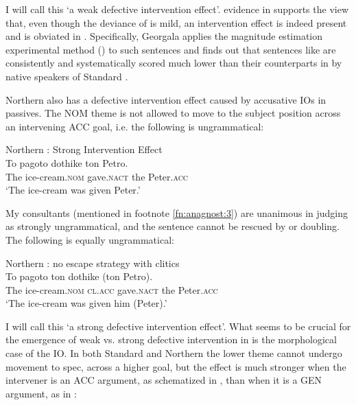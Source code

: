 \documentclass[output=paper]{LSP/langsci}
\begin{document}
I will call this ‘a weak defective intervention effect’.  evidence in \citet{Georgala2012} supports the view that, even though the deviance of  is mild, an intervention effect is indeed present and is obviated in . Specifically, Georgala applies the magnitude estimation experimental method (\citealt{GurmanEtAl1996,Cowart1997,Keller2000}) to such sentences and finds out that sentences like  are consistently and systematically scored much lower than their counterparts in  by native speakers of Standard .   

Northern  also has a defective intervention effect caused by accusative IOs in passives. The NOM theme is not allowed to move to the subject position across an intervening ACC goal, i.e. the following is ungrammatical:

\largerpage
\ea\label{ex:anagnost:17}
Northern : Strong Intervention Effect\\
\gll   * To pagoto dothike  ton Petro.\\
  {} The ice-cream.\textsc{nom}  gave.\textsc{nact} the Peter.\textsc{acc}\\

\glt 
  ‘The ice-cream was given Peter.’    
\z


My consultants (mentioned in footnote \ref{fn:anagnost:3}) are unanimous in judging  as strongly ungrammatical, and the sentence cannot be rescued by  or doubling. The following is equally ungrammatical:


\ea \label{ex:anagnost:18}
Northern : no escape strategy with clitics\\
\gll *To pagoto ton dothike (ton Petro).\\
  The ice-cream.\textsc{nom}  \textsc{cl}.\textsc{acc} gave.\textsc{nact} the Peter.\textsc{acc}\\
\glt 
  ‘The ice-cream was given him (Peter).’
\z

I will call this ‘a strong defective intervention effect’. What seems to be crucial for the emergence of weak vs. strong defective intervention in  is the morphological case of the IO. In both Standard and Northern  the lower theme cannot undergo movement to spec, across a higher goal, but the effect is much stronger when the intervener is an ACC argument, as schematized in , than when it is a GEN argument, as in : 
\end{document}
